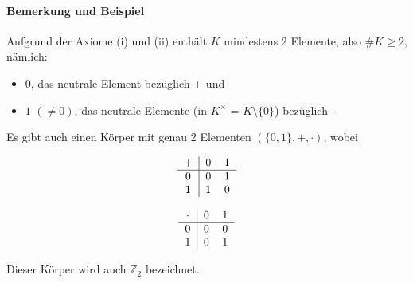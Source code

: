  	\paragraph{Bemerkung und Beispiel}
 		Aufgrund der Axiome (i) und (ii) enthält $ K $ mindestens 2 Elemente, also $ \# K \geq 2 $, nämlich:
 		\begin{itemize}
 			\item $ 0 $, das neutrale Element bezüglich $+$ und
 			\item $1$ $(\neq 0)$, das neutrale Elemente (in $K^\times$ = $K\setminus\{0\}$) bezüglich $\cdot$
 		\end{itemize}
 		Es gibt auch einen Körper mit genau 2 Elementen $(\{0,1\},+,\cdot)$, wobei

 		\begin{minipage}{0.45\textwidth}
 			\begin{equation*}
 				\begin{tabular}{c|cc}
 					$+$ & 0 & 1 \\\hline
 					0   & 0 & 1 \\
 					1   & 1 & 0 \\
 				\end{tabular}
 			\end{equation*}
 		\end{minipage}
 		\begin{minipage}{0.45\textwidth}
 			\begin{equation*}
 				\begin{tabular}{c|cc}
 					$\cdot$ & 0 & 1 \\\hline
 					0       & 0 & 0 \\
 					1       & 0 & 1 \\
 				\end{tabular}
 			\end{equation*}
 		\end{minipage}

 		Dieser Körper wird auch $\mathbb{Z}_2$ bezeichnet.

